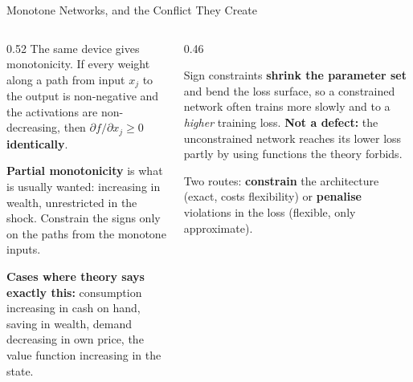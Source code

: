 \begin{frame}{Monotone Networks, and the Conflict They Create}
\begin{columns}[T]
\begin{column}{0.52\textwidth}
\small
The same device gives monotonicity. If every weight along a path from input $x_j$ to the output is non-negative and the activations are non-decreasing, then $\partial f/\partial x_j\ge0$ \textbf{identically}.
\medskip

\textbf{Partial monotonicity} is what is usually wanted: increasing in wealth, unrestricted in the shock. Constrain the signs only on the paths from the monotone inputs.
\medskip

\textbf{Cases where theory says exactly this:} consumption increasing in cash on hand, saving in wealth, demand decreasing in own price, the value function increasing in the state.
\end{column}
\begin{column}{0.46\textwidth}
\begin{cautionbox}[title=\textbf{The optimization conflict}]\small
Sign constraints \textbf{shrink the parameter set} and bend the loss surface, so a constrained network often trains more slowly and to a \emph{higher} training loss.
\medskip
\textbf{Not a defect:} the unconstrained network reaches its lower loss partly by using functions the theory forbids.
\end{cautionbox}
\medskip
{\footnotesize Two routes: \textbf{constrain} the architecture (exact, costs flexibility) or \textbf{penalise} violations in the loss (flexible, only approximate).}
\end{column}
\end{columns}
\end{frame}

